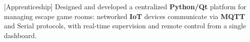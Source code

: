 [Apprenticeship]
Designed and developed a centralized \textbf{Python/Qt} platform for managing escape game rooms: networked \textbf{IoT} devices communicate via \textbf{MQTT} and Serial protocols, with real-time supervision and remote control from a single dashboard.
